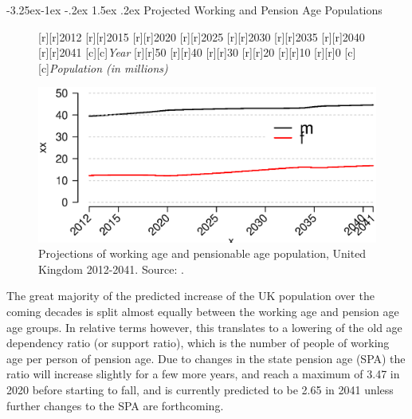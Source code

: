 \documentclass[11 pt, a4paper]{report}
\makeatletter
\renewcommand\subsection{\@startsection{subsection}{2}{\z@}%
                                     {-3.25ex\@plus -1ex \@minus -.2ex}%
                                     {1.5ex \@plus .2ex}%
    								{\large\scshape}}
\makeatother
\begin{document}
\clearpage
\subsection{Projected Working and Pension Age Populations}

\begin{figure}[hbtp!]
[r][r]{\small{2012}}
[r][r]{\small{2015}}
[r][r]{\small{2020}}
[r][r]{\small{2025}}
[r][r]{\small{2030}}
[r][r]{\small{2035}}
[r][r]{\small{2040}}
[r][r]{\small{2041}}
[c][c]{\normalsize{\emph{Year}}}
[r][r]{\small{50}}
[r][r]{\small{40}}
[r][r]{\small{30}}
[r][r]{\small{20}}
[r][r]{\small{10}}
[r][r]{\small{0}}
[c][c]{\small{\emph{Population (in millions)}}}

\includegraphics[width=\textwidth]{../figures/Fig4.3.eps}
\caption{Projections of working age and pensionable age population\protect \footnotemark, United Kingdom 2012-2041. Source: \cite{ONS2013c}.}
 
\label{Fig:14}
\end{figure}

The great majority of the predicted increase of the UK population over the coming decades is split almost equally between the working age and pension age age groups. In relative terms however, this translates to a lowering of the old age dependency ratio (or support ratio), which is the number of people of working age per person of pension age. Due to changes in the state pension age (SPA) the ratio will increase slightly for a few more years, and reach a maximum of 3.47 in 2020 before starting to fall, and is currently predicted to be 2.65 in 2041 unless further changes to the SPA are forthcoming. 


\end{document}
